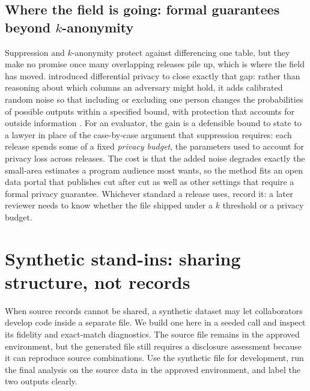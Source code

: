 \subsection{Where the field is going: formal guarantees beyond \texorpdfstring{$k$}{k}-anonymity}\label{sec:frontier-dp}
Suppression and $k$-anonymity protect against differencing one table, but they make no promise once many overlapping releases pile up, which is where the field has moved. \textcite{dwork2006diffpriv} introduced differential privacy to close exactly that gap: rather than reasoning about which columns an adversary might hold, it adds calibrated random noise so that including or excluding one person changes the probabilities of possible outputs within a specified bound, with protection that accounts for outside information \parencite{dworkroth2014found}.  For an evaluator, the gain is a defensible bound to state to a lawyer in place of the case-by-case argument that suppression requires: each release spends some of a fixed \emph{privacy budget}, the parameters used to account for privacy loss across releases. The cost is that the added noise degrades exactly the small-area estimates a program audience most wants, so the method fits an open data portal that publishes cut after cut as well as other settings that require a formal privacy guarantee. Whichever standard a release uses, record it: a later reviewer needs to know whether the file shipped under a $k$ threshold or a privacy budget.

\section{Synthetic stand-ins: sharing structure, not records}\label{sec:synth}
When source records cannot be shared, a synthetic dataset may let collaborators develop code inside a separate file. We build one here in a seeded call and inspect its fidelity and exact-match diagnostics. The source file remains in the approved environment, but the generated file still requires a disclosure assessment because it can reproduce source combinations. Use the synthetic file for development, run the final analysis on the source data in the approved environment, and label the two outputs clearly.


